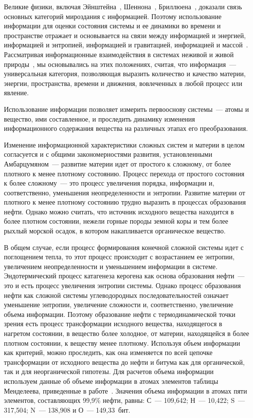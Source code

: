 \begin{multicols}{2}
     Великие физики, включая Эйнштейна~\cite{29s}, Шеннона~\cite{27s}, 
Бриллюена~\cite{5s}, доказали связь основных категорий мироздания с 
информацией. Поэтому использование информации для оценки состояния системы 
и ее динамики во времени и пространстве отражает и основывается на связи между 
информацией и энергией, информацией и энтропией, информацией и гравитацией, 
ин\-форма\-ци\-ей и массой~\cite{7s}. Рассматривая информационные взаимодействия в 
системах неживой и живой природы~\cite{20s}, мы основывались на этих 
положениях, считая, что информация~--- универсальная категория, позволяющая 
выразить количество и качество материи, энергии, пространства, времени и 
движения, вовлеченных в любой процесс или явление.
     
     Использование информации позволяет измерить первооснову системы~--- 
атомы и вещество, ими составленное, и проследить динамику изменения 
информационного содержания вещества на различных этапах его преобразования. 
     
     Изменение информационной характеристики сложных систем и материи в 
целом согласуется и с общими закономерностями развития, уста\-нов\-лен\-ны\-ми 
Амбарцумяном~--- развитие материи идет от простого к сложному, от более 
плотного к менее плотному состоянию. Процесс перехода от простого состояния к 
более сложному~--- это процесс увеличения порядка, информации и, 
соответственно, уменьшения неопределенности и энтропии. Развитие материи от 
плотного к менее плотному состоянию трудно выразить в процессах образования 
нефти. Однако можно считать, что источник исходного вещества находится в более 
плотном состоянии, нежели горные породы земной коры и тем более рыхлый 
морской осадок, в котором накапливается органическое вещество.
     
     В общем случае, если процесс формирования конечной сложной системы 
идет с поглощением тепла, то этот процесс происходит с возрастанием ее 
энтропии, увеличением неопределенности и уменьшением информации в системе. 
Эндотермический процесс катагенеза керогена как основа\linebreak
образования нефти~--- 
это и есть процесс увеличения энтропии системы. Однако процесс образования 
нефти как сложной системы углеводородных последовательностей означает 
уменьшение\linebreak
 энтропии, увеличение сложности и, соответственно, увеличение 
объема информации. Поэтому образование нефти с термодинамической точки 
зрения есть процесс трансформации исходного вещества, находящегося в нагретом 
состоянии, в вещество более холодное, от материи, находящейся в более плотном 
состоянии, к веществу менее плотному. Используя объем информации как 
критерий, можно проследить, как она изменяется по всей цепочке трансформации 
от исходного вещества до нефти и битума как для органической, так и для 
неорганической гипотезы.
     Для расчетов объема информации используем данные об объеме информации 
в атомах элементов таблицы Менделеева, приведенные в работе~\cite{8s}. 
Значения объема информации в атомах пяти элементов, составляющих 99,9\% 
нефти, равны: 
     С~--- 109,642; Н~--- 10,422; S~--- 317,504; N~--- 138,908 и О~--- 149,33~бит.
     

\end{multicols}
